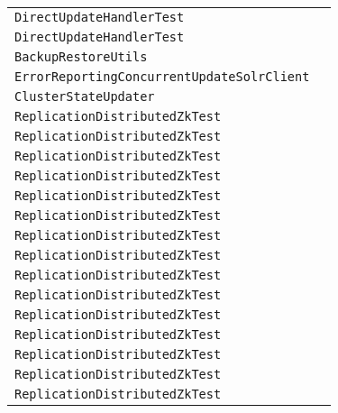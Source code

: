 \begin{center}
\begin{tabular}{ll}
\lstinline/DirectUpdateHandlerTest/&\raisebox{0pt}{\lstinline/PrepareCommit()/}\\
\lstinline/DirectUpdateHandlerTest/&\raisebox{0pt}{\lstinline/PrepareCommit()/}\\
\lstinline/BackupRestoreUtils/&\raisebox{0pt}{\lstinline/intindexDocs(SolrClient)/}\\ 
\lstinline/ErrorReportingConcurrentUpdateSolrClient/&\raisebox{0pt}{\lstinline/handleError(Throwable)/}\\
\lstinline/ClusterStateUpdater/&\raisebox{0pt}{\lstinline/LeaderStatusamILeader()/}\\
\lstinline/ReplicationDistributedZkTest/&\raisebox{0pt}{\lstinline/testBatchBoundaries()/}\\
\lstinline/ReplicationDistributedZkTest/&\raisebox{0pt}{\lstinline/testBatchBoundaries()/}\\
\lstinline/ReplicationDistributedZkTest/&\raisebox{0pt}{\lstinline/testBatchBoundaries()/}\\
\lstinline/ReplicationDistributedZkTest/&\raisebox{0pt}{\lstinline/testBatchBoundaries()/}\\
\lstinline/ReplicationDistributedZkTest/&\raisebox{0pt}{\lstinline/testBatchBoundaries()/}\\
\lstinline/ReplicationDistributedZkTest/&\raisebox{0pt}{\lstinline/testBatchBoundaries()/}\\
\lstinline/ReplicationDistributedZkTest/&\raisebox{0pt}{\lstinline/testBatchBoundaries()/}\\
\lstinline/ReplicationDistributedZkTest/&\raisebox{0pt}{\lstinline/testBatchBoundaries()/}\\
\lstinline/ReplicationDistributedZkTest/&\raisebox{0pt}{\lstinline/testBatchBoundaries()/}\\
\lstinline/ReplicationDistributedZkTest/&\raisebox{0pt}{\lstinline/testBatchBoundaries()/}\\
\lstinline/ReplicationDistributedZkTest/&\raisebox{0pt}{\lstinline/testBatchBoundaries()/}\\
\lstinline/ReplicationDistributedZkTest/&\raisebox{0pt}{\lstinline/testBatchBoundaries()/}\\
\lstinline/ReplicationDistributedZkTest/&\raisebox{0pt}{\lstinline/testBatchBoundaries()/}\\
\lstinline/ReplicationDistributedZkTest/&\raisebox{0pt}{\lstinline/testBatchBoundaries()/}\\
\lstinline/ReplicationDistributedZkTest/&\raisebox{0pt}{\lstinline/testBatchBoundaries()/}\\

\end{tabular}
\end{center}
